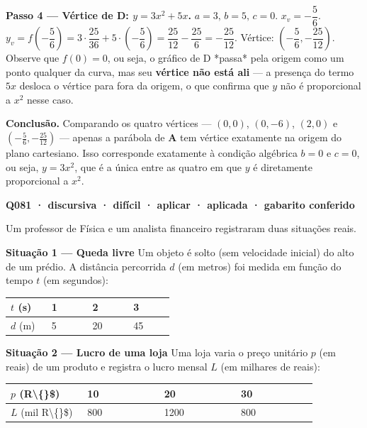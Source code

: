 \documentclass[11pt,a4paper]{article}
\begin{document}
\textbf{Passo 4 — Vértice de D: $y=3x^2+5x$.}
$a=3,\,b=5,\,c=0$. $x_v = -\dfrac{5}{6}$.
$y_v = f\left(-\dfrac{5}{6}\right) = 3\cdot\dfrac{25}{36} + 5\cdot\left(-\dfrac{5}{6}\right) = \dfrac{25}{12} - \dfrac{25}{6} = -\dfrac{25}{12}$.
Vértice: $\left(-\dfrac{5}{6}, -\dfrac{25}{12}\right)$.
Observe que $f(0)=0$, ou seja, o gráfico de D *passa* pela origem como um ponto qualquer da curva, mas seu \textbf{vértice não está ali} — a presença do termo $5x$ desloca o vértice para fora da origem, o que confirma que $y$ não é proporcional a $x^2$ nesse caso.

\textbf{Conclusão.} Comparando os quatro vértices — $(0,0)$, $(0,-6)$, $(2,0)$ e $\left(-\frac56,-\frac{25}{12}\right)$ — apenas a parábola de \textbf{A} tem vértice exatamente na origem do plano cartesiano. Isso corresponde exatamente à condição algébrica $b=0$ e $c=0$, ou seja, $y=3x^2$, que é a única entre as quatro em que $y$ é diretamente proporcional a $x^2$.

\bigskip\noindent\textbf{Q081 · discursiva · difícil · aplicar · aplicada · gabarito conferido}\par\nopagebreak
Um professor de Física e um analista financeiro registraram duas situações reais.

\textbf{Situação 1 — Queda livre}
Um objeto é solto (sem velocidade inicial) do alto de um prédio. A distância percorrida $d$ (em metros) foi medida em função do tempo $t$ (em segundos):

\begin{center}
\begin{tabular}{|p{0.215\linewidth}|p{0.215\linewidth}|p{0.215\linewidth}|p{0.215\linewidth}|}
\hline
\textbf{$t$ (s)} & \textbf{1} & \textbf{2} & \textbf{3} \\
\hline
$d$ (m) & 5 & 20 & 45 \\
\hline
\end{tabular}
\end{center}

\textbf{Situação 2 — Lucro de uma loja}
Uma loja varia o preço unitário $p$ (em reais) de um produto e registra o lucro mensal $L$ (em milhares de reais):

\begin{center}
\begin{tabular}{|p{0.215\linewidth}|p{0.215\linewidth}|p{0.215\linewidth}|p{0.215\linewidth}|}
\hline
\textbf{$p$ (R\textbackslash\{\}\$)} & \textbf{10} & \textbf{20} & \textbf{30} \\
\hline
$L$ (mil R\textbackslash\{\}\$) & 800 & 1200 & 800 \\
\hline
\end{tabular}
\end{center}
\end{document}
